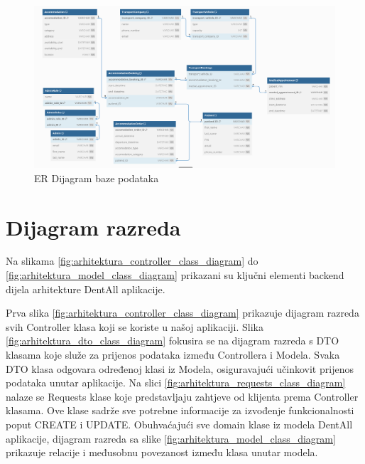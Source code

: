 				\begin{figure}[H]
					\includegraphics[scale=0.32]{slike/dijagram_baze.png} %
					\centering
					\caption{ER Dijagram baze podataka}
					\label{fig:dijagram_baze_podataka}
				\end{figure}
			
			\eject
			
			
		\section{Dijagram razreda}
		
			Na slikama \ref{fig:arhitektura_controller_class_diagram}  do \ref{fig:arhitektura_model_class_diagram}  prikazani su ključni elementi backend dijela arhitekture DentAll aplikacije. 
			
			Prva slika \ref{fig:arhitektura_controller_class_diagram}  prikazuje dijagram razreda svih Controller klasa koji se koriste u našoj aplikaciji.  Slika \ref{fig:arhitektura_dto_class_diagram} fokusira se na dijagram razreda s DTO klasama koje služe za prijenos podataka između Controllera i Modela. Svaka DTO klasa odgovara određenoj klasi iz Modela, osiguravajući učinkovit prijenos podataka unutar aplikacije. Na slici \ref{fig:arhitektura_requests_class_diagram} nalaze se Requests klase koje predstavljaju zahtjeve od klijenta prema Controller klasama. Ove klase sadrže sve potrebne informacije za izvođenje funkcionalnosti poput CREATE i UPDATE. Obuhvaćajući sve domain klase iz modela DentAll aplikacije, dijagram razreda sa slike  \ref{fig:arhitektura_model_class_diagram} prikazuje relacije i međusobnu povezanost između klasa unutar modela. 
			
